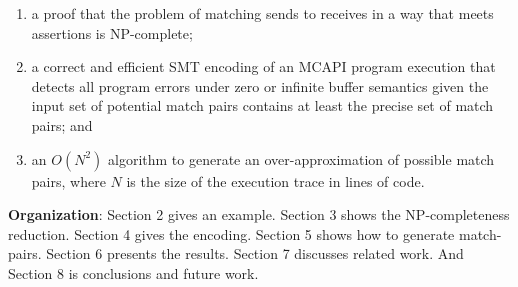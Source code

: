 \begin{enumerate}
\item a proof that the problem of matching sends to receives in a way that meets assertions is NP-complete;
\item a correct and efficient SMT encoding of an MCAPI program
  execution that detects all program errors under zero or infinite
  buffer semantics given the input set of potential match pairs
  contains at least the precise set of match pairs; and
\item an $O(N^2)$ algorithm to generate an over-approximation of
  possible match pairs, where $N$ is the size of the execution trace
  in lines of code.
\end{enumerate}

\noindent \textbf{Organization}: Section 2 gives an example. Section 3
shows the NP-completeness reduction. Section 4 gives the
encoding. Section 5 shows how to generate match-pairs.  Section 6
presents the results. Section 7 discusses related work. And Section 8
is conclusions and future work.

